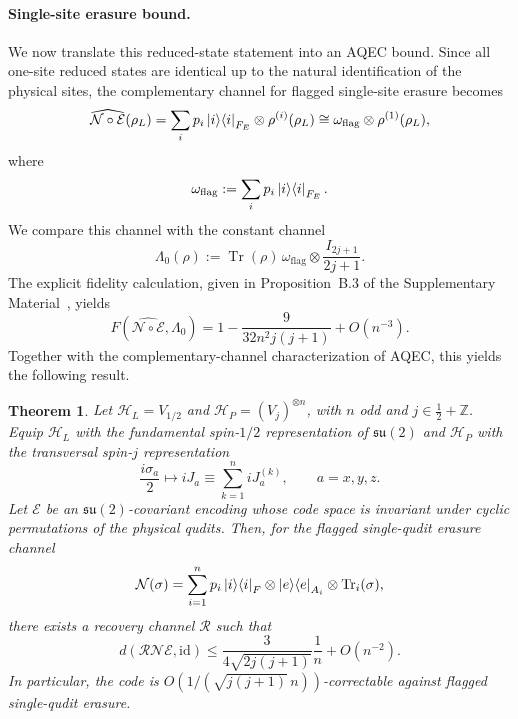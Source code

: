 \documentclass[10pt,twocolumn,superscriptaddress,aps,amsmath,amssymb,citeautoscript,floatfix,prx,longbibliography]{revtex4-2}
\newtheorem{theorem}{Theorem}
\theoremstyle{plain}
\theoremstyle{plain}
\theoremstyle{plain}
\theoremstyle{plain}
\theoremstyle{plain}
\theoremstyle{plain}
\begin{document}
\paragraph{Single-site erasure bound.}
We now translate this reduced-state statement into an AQEC bound. Since all one-site reduced states are identical up to the natural identification of the physical sites, the complementary channel for flagged single-site erasure becomes
\begin{equation}\label{eq:comp_chan_su2}
    \widehat{\mathcal N\circ\mathcal E}(\rho_L)
    =
    \sum_i p_i\ket i\!\bra i_{F_E}\otimes \rho^{(i)}(\rho_L)
    \cong
    \omega_{\mathrm{flag}}\otimes \rho^{(1)}(\rho_L),
\end{equation}
where
\[
    \omega_{\mathrm{flag}}
    :=
    \sum_i p_i\ket i\!\bra i_{F_E} .
\]
We compare this channel with the constant channel
\[
    \Lambda_0(\rho)
    :=
    \operatorname{Tr}(\rho)\,
    \omega_{\mathrm{flag}}\otimes \frac{I_{2j+1}}{2j+1} .
\]
The explicit fidelity calculation, given in Proposition~B.3 of the Supplementary Material~\cite{SuppMat}, yields
\begin{equation}\label{eq:fidelity_su2}
    F\!\left(\widehat{\mathcal N\circ\mathcal E},\Lambda_0\right)
    =
    1-
    \frac{9}{32n^2j(j+1)}
    +O(n^{-3}) .
\end{equation}
Together with the complementary-channel characterization of AQEC, this yields the following result.

\begin{theorem}\label{thrm:su2scale}
Let $\mathcal H_L=V_{1/2}$ and $\mathcal H_P=(V_j)^{\otimes n}$, with $n$ odd and $j\in\frac12+\mathbb Z$. Equip $\mathcal H_L$ with the fundamental spin-$1/2$ representation of $\mathfrak{su}(2)$ and $\mathcal H_P$ with the transversal spin-$j$ representation
\begin{equation}
    \frac{i\sigma_a}{2}
    \longmapsto
    iJ_a
    \equiv
    \sum_{k=1}^n iJ_a^{(k)},
    \qquad a=x,y,z .
\end{equation}
Let $\mathcal E$ be an $\mathfrak{su}(2)$-covariant encoding whose code space is invariant under cyclic permutations of the physical qudits. Then, for the flagged single-qudit erasure channel
\[
    \mathcal N(\sigma)
    =
    \sum_{i=1}^n p_i\ket i\!\bra i_F
    \otimes \ket e\!\bra e_{A_i}
    \otimes \operatorname{Tr}_i(\sigma),
\]
there exists a recovery channel $\mathcal R$ such that
\[
    d(\mathcal R\mathcal N\mathcal E,\mathrm{id})
    \le
    \frac{3}{4\sqrt{2j(j+1)}}\frac{1}{n}
    +O(n^{-2}) .
\]
In particular, the code is $O\!\left(1/(\sqrt{j(j+1)}\,n)\right)$-correctable against flagged single-qudit erasure.
\end{theorem}
\end{document}
